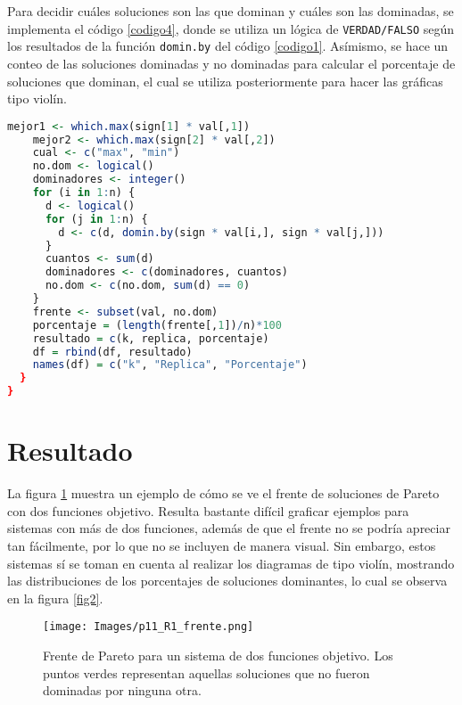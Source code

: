 \documentclass{report}
\begin{document}
Para decidir cu\'ales soluciones son las que dominan y cu\'ales son las dominadas, se implementa el c\'odigo \ref{codigo4}, donde se utiliza un l\'ogica de \texttt{VERDAD/FALSO} seg\'un los resultados de la funci\'on \texttt{domin.by} del c\'odigo \ref{codigo1}. As\'imismo, se hace un conteo de las soluciones dominadas y no dominadas para calcular el porcentaje de soluciones que dominan, el cual se utiliza posteriormente para hacer las gr\'aficas tipo viol\'in.

\begin{lstlisting}[caption=Decisi\'on y Conteo de Soluciones Dominadas y No Dominadas, label=codigo4, language=R]
    mejor1 <- which.max(sign[1] * val[,1])
    mejor2 <- which.max(sign[2] * val[,2])
    cual <- c("max", "min")
    no.dom <- logical()
    dominadores <- integer()
    for (i in 1:n) {
      d <- logical()
      for (j in 1:n) {
        d <- c(d, domin.by(sign * val[i,], sign * val[j,]))
      }
      cuantos <- sum(d)
      dominadores <- c(dominadores, cuantos)
      no.dom <- c(no.dom, sum(d) == 0)
    }
    frente <- subset(val, no.dom)
    porcentaje = (length(frente[,1])/n)*100
    resultado = c(k, replica, porcentaje)
    df = rbind(df, resultado)
    names(df) = c("k", "Replica", "Porcentaje")
  }
}
\end{lstlisting}

\section{Resultado}

La figura \ref{fig1} muestra un ejemplo de c\'omo se ve el frente de soluciones de Pareto con dos funciones objetivo. Resulta bastante dif\'icil graficar ejemplos para sistemas con m\'as de dos funciones, adem\'as de que el frente no se podr\'ia apreciar tan f\'acilmente, por lo que no se incluyen de manera visual. Sin embargo, estos sistemas s\'i se toman en cuenta al realizar los diagramas de tipo viol\'in, mostrando las distribuciones de los porcentajes de soluciones dominantes, lo cual se observa en la figura \ref{fig2}.

\begin{figure}[h]
    \centering
    \texttt{[image: Images/p11\_R1\_frente.png]}
    \caption{Frente de Pareto para un sistema de dos funciones objetivo. Los puntos verdes representan aquellas soluciones que no fueron dominadas por ninguna otra.}
    \label{fig1}
\end{figure}

\newpage
\end{document}
